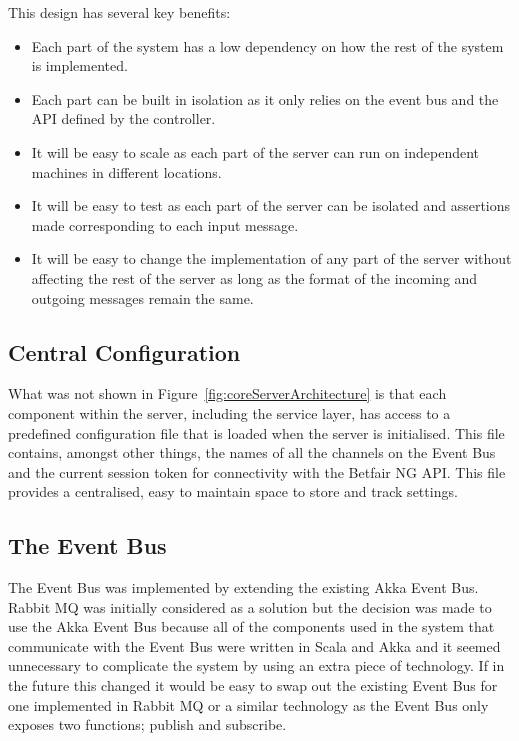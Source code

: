 	This design has several key benefits:
	
	\begin{itemize}
		\item Each part of the system has a low dependency on how the rest of the system is implemented.	
		\item Each part can be built in isolation as it only relies on the event bus and the API defined by the controller.
		\item It will be easy to scale as each part of the server can run on independent machines in different locations.
		\item It will be easy to test as each part of the server can be isolated and assertions made corresponding to each input message.
		\item It will be easy to change the implementation of any part of the server without affecting the rest of the server as long as the format of the incoming and outgoing messages remain the same.
	\end{itemize}
	
	\subsection{Central Configuration}	
		What was not shown in Figure~\ref{fig:coreServerArchitecture} is that each component within the server, including the service layer, has access to a predefined configuration file that is loaded when the server is initialised. This file contains, amongst other things, the names of all the channels on the Event Bus and the current session token for connectivity with the Betfair NG API. This file provides a centralised, easy to maintain space to store and track settings.
		
	\subsection{The Event Bus}
		The Event Bus was implemented by extending the existing Akka Event Bus. Rabbit MQ\cite{RabbitMQ} was initially considered as a solution but the decision was made to use the Akka Event Bus because all of the components used in the system that communicate with the Event Bus were written in Scala and Akka and it seemed unnecessary to complicate the system by using an extra piece of technology. If in the future this changed it would be easy to swap out the existing Event Bus for one implemented in Rabbit MQ or a similar technology as the Event Bus only exposes two functions; publish and subscribe.\\
		
